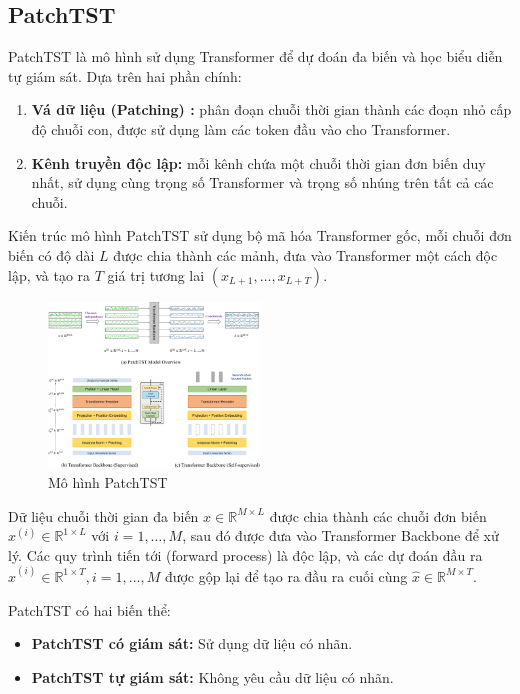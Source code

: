 \documentclass[conference]{IEEEtran}
\begin{document}
\subsection{PatchTST}
PatchTST là mô hình sử dụng Transformer để dự đoán đa biến và học biểu diễn tự giám sát. Dựa trên hai phần chính: \\
\begin{enumerate}
    \item \textbf{Vá dữ liệu (Patching) :} phân đoạn chuỗi thời gian thành các đoạn nhỏ cấp độ chuỗi con, được sử dụng làm các token đầu vào cho Transformer.
    \item \textbf{Kênh truyền độc lập:} mỗi kênh chứa một chuỗi thời gian đơn biến duy nhất, sử dụng cùng trọng số Transformer và trọng số nhúng trên tất cả các chuỗi. 
\end{enumerate}
Kiến trúc mô hình PatchTST sử dụng bộ mã hóa Transformer gốc, mỗi chuỗi đơn biến có độ dài \( L \) được chia thành các mảnh, đưa vào Transformer một cách độc lập, và tạo ra \( T \) giá trị tương lai \( (x_{L+1}, \ldots, x_{L+T}) \).
\begin{figure}[H]
    \centering
    \includegraphics[width=0.5\textwidth]{bibliography/Figure/PatchTSTWorkflow.png}
    \caption{Mô hình PatchTST}
    \label{fig:PatchTST_Model}
\end{figure}
Dữ liệu chuỗi thời gian đa biến \( x \in \mathbb{R}^{M \times L} \) được chia thành các chuỗi đơn biến \( x^{(i)} \in \mathbb{R}^{1 \times L} \) với \( i = 1, \ldots, M \), sau đó được đưa vào Transformer Backbone để xử lý. Các quy trình tiến tới (forward process) là độc lập, và các dự đoán đầu ra \( \hat{x}^{(i)} \in \mathbb{R}^{1 \times T}, i = 1, \ldots, M \) được gộp lại để tạo ra đầu ra cuối cùng \( \hat{x} \in \mathbb{R}^{M \times T} \).

PatchTST có hai biến thể:
\begin{itemize}
    \item \textbf{PatchTST có giám sát:} Sử dụng dữ liệu có nhãn.
    \item \textbf{PatchTST tự giám sát:} Không yêu cầu dữ liệu có nhãn.
\end{itemize}
\end{document}
